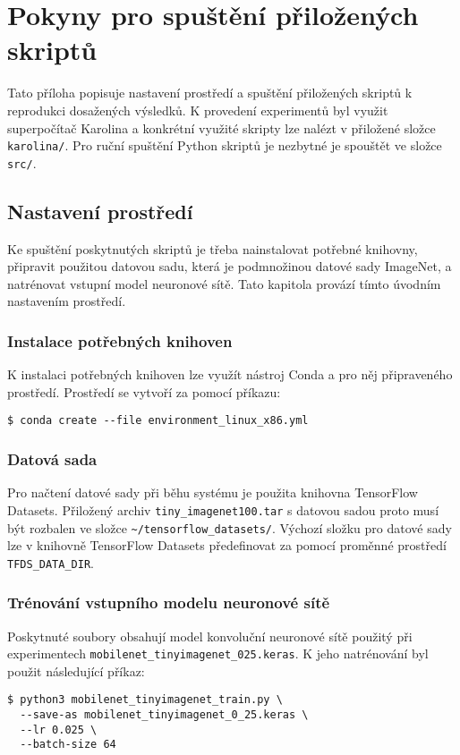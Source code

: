 \chapter{Pokyny pro spuštění přiložených skriptů}

Tato příloha popisuje nastavení prostředí a spuštění přiložených skriptů k reprodukci dosažených výsledků. K provedení experimentů byl využit superpočítač Karolina a konkrétní využité skripty lze nalézt v přiložené složce \verb|karolina/|. Pro ruční spuštění Python skriptů je nezbytné je spouštět ve složce \verb|src/|.

\section{Nastavení prostředí}

Ke spuštění poskytnutých skriptů je třeba nainstalovat potřebné knihovny, připravit použitou datovou sadu, která je podmnožinou datové sady ImageNet, a natrénovat vstupní model neuronové sítě. Tato kapitola provází tímto úvodním nastavením prostředí.  

\subsection{Instalace potřebných knihoven}

K instalaci potřebných knihoven lze využít nástroj Conda a pro něj připraveného prostředí. Prostředí se vytvoří za pomocí příkazu:
\begin{lstlisting}
$ conda create --file environment_linux_x86.yml
\end{lstlisting}

\subsection{Datová sada}

Pro načtení datové sady při běhu systému je použita knihovna TensorFlow Datasets. Přiložený archiv \verb|tiny_imagenet100.tar| s datovou sadou proto musí být rozbalen ve složce \verb|~/tensorflow_datasets/|. Výchozí složku pro datové sady lze v knihovně TensorFlow Datasets předefinovat za pomocí proměnné prostředí \verb|TFDS_DATA_DIR|.

\subsection{Trénování vstupního modelu neuronové sítě}

Poskytnuté soubory obsahují model konvoluční neuronové sítě použitý při experimentech \verb|mobilenet_tinyimagenet_025.keras|. K jeho natrénování byl použit následující příkaz:
\begin{lstlisting}
$ python3 mobilenet_tinyimagenet_train.py \
  --save-as mobilenet_tinyimagenet_0_25.keras \
  --lr 0.025 \
  --batch-size 64 
\end{lstlisting}

